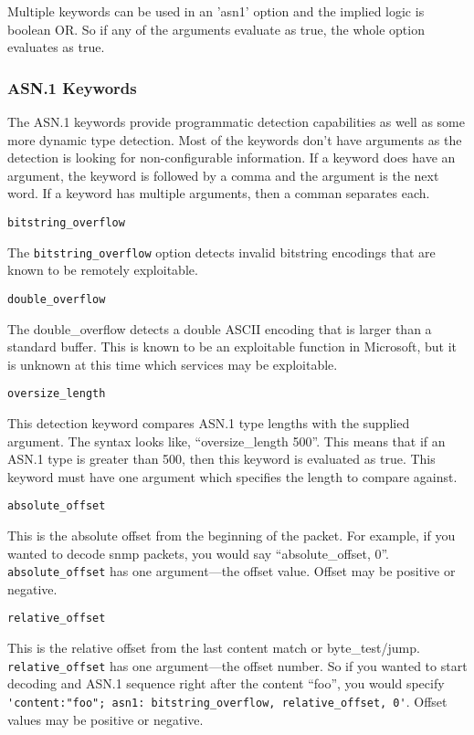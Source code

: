 \documentclass[english]{report}
\newcounter{slistnum}
\newenvironment{slist}
{ \begin{list}{ {\bf \arabic{slistnum}.} }{\usecounter{slistnum} } }
{ \end{list} }
\begin{document}
Multiple keywords can be used in an 'asn1' option and the implied logic is
boolean OR.  So if any of the arguments evaluate as true, the whole option
evaluates as true.

\subsubsection{ASN.1 Keywords\label{asn1 keywords}}


The ASN.1 keywords provide programmatic detection capabilities as well as some
more dynamic type detection.  Most of the keywords don't have arguments as the
detection is looking for non-configurable information.  If a keyword does have
an argument, the keyword is followed by a comma and the argument is the next
word.  If a keyword has multiple arguments, then a comman separates each.

\begin{slist}

\item \texttt{bitstring\_overflow}


The \texttt{bitstring\_overflow} option detects invalid bitstring encodings that are known to be
remotely exploitable.

\item \texttt{double\_overflow}


The double\_overflow detects a double ASCII encoding that is larger than a
standard buffer.  This is known to be an exploitable function in Microsoft, but
it is unknown at this time which services may be exploitable.

\item \texttt{oversize\_length}


This detection keyword compares ASN.1 type lengths with the supplied argument.
The syntax looks like, ``oversize\_length 500''.  This means that if an ASN.1
type is greater than 500, then this keyword is evaluated as true.  This
keyword must have one argument which specifies the length to compare against.

\item \texttt{absolute\_offset}


This is the absolute offset from the beginning of the packet.  For example, if
you wanted to decode snmp packets, you would say ``absolute\_offset, 0''.  
\texttt{absolute\_offset} has one argument---the offset value.  Offset may be
positive or negative.

\item \texttt{relative\_offset}


This is the relative offset from the last content match or byte\_test/jump. 
\texttt{relative\_offset} has one argument---the offset number.  So if you 
wanted to start decoding and ASN.1 sequence right after the content ``foo'', 
you would specify \verb!'content:"foo"; asn1: bitstring_overflow, relative_offset, 0'!.  Offset values may be positive or negative.

\end{slist}
\end{document}
